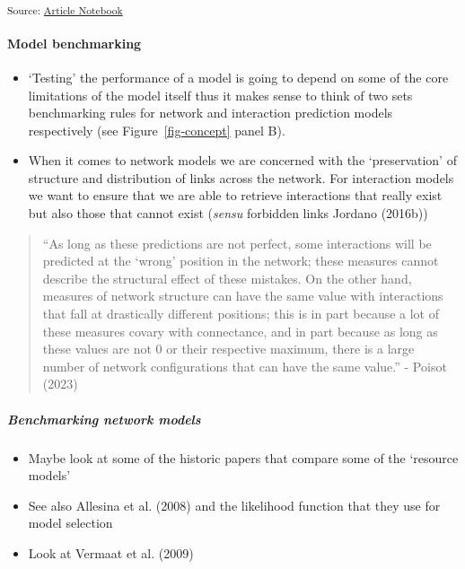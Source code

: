 \documentclass[
]{agujournal2019}
\let\oldparagraph\paragraph
\renewcommand{\paragraph}[1]{\oldparagraph{#1}\mbox{}}
\let\oldsubparagraph\subparagraph
\renewcommand{\subparagraph}[1]{\oldsubparagraph{#1}\mbox{}}
\begin{document}
\textsubscript{Source:
\href{https://BecksLab.github.io/ms_t_is_for_topology/index.qmd.html}{Article
Notebook}}

\paragraph{Model benchmarking}\label{model-benchmarking}

\begin{itemize}
\item
  `Testing' the performance of a model is going to depend on some of the
  core limitations of the model itself thus it makes sense to think of
  two sets benchmarking rules for network and interaction prediction
  models respectively (see Figure~\ref{fig-concept} panel B).
\item
  When it comes to network models we are concerned with the
  `preservation' of structure and distribution of links across the
  network. For interaction models we want to ensure that we are able to
  retrieve interactions that really exist but also those that cannot
  exist (\emph{sensu} forbidden links Jordano (2016b))
\end{itemize}

\begin{quote}
``As long as these predictions are not perfect, some interactions will
be predicted at the `wrong' position in the network; these measures
cannot describe the structural effect of these mistakes. On the other
hand, measures of network structure can have the same value with
interactions that fall at drastically different positions; this is in
part because a lot of these measures covary with connectance, and in
part because as long as these values are not 0 or their respective
maximum, there is a large number of network configurations that can have
the same value.'' - Poisot (2023)
\end{quote}

\subparagraph{Benchmarking network
models}\label{benchmarking-network-models}

\begin{itemize}
\item
  Maybe look at some of the historic papers that compare some of the
  `resource models'
\item
  See also Allesina et al. (2008) and the likelihood function that they
  use for model selection
\item
  Look at Vermaat et al. (2009)
\end{itemize}
\end{document}
